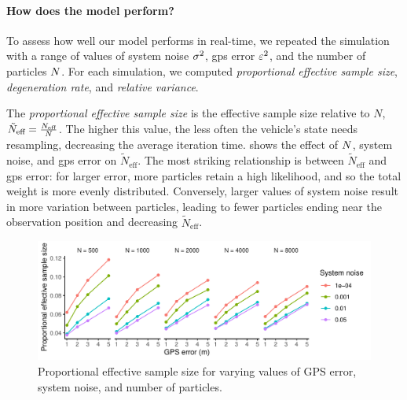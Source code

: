 \paragraph{How does the model perform?}





To assess how well our model performs in real-time, we repeated the simulation with a range of values of system noise $\sigma^2$, \gls{gps} error $\varepsilon^2$, and the number of particles $N$. For each simulation, we computed \emph{proportional effective sample size}, \emph{degeneration rate}, and \emph{relative variance}.

The \emph{proportional effective sample size} is the effective sample size relative to $N$, $\tilde N_\text{eff} = \frac{N_\text{eff}}{N}$. The higher this value, the less often the vehicle's state needs resampling, decreasing the average iteration time.  shows the effect of $N$, system noise, and \gls{gps} error on $\tilde N_\text{eff}$. The most striking relationship is between $\tilde N_\text{eff}$ and \gls{gps} error: for larger error, more particles retain a high likelihood, and so the total weight is more evenly distributed. Conversely, larger values of system noise result in more variation between particles, leading to fewer particles ending near the observation position and decreasing $\tilde N_\text{eff}$.

\begin{knitrout}\small
{}\color{fgcolor}\begin{figure}

{\centering \includegraphics[width=\textwidth]{figure/model_performance_neff-1} 

}

\caption[Proportional effective sample size for varying values of GPS error, system noise, and number of particles]{Proportional effective sample size for varying values of GPS error, system noise, and number of particles.}\label{fig:model_performance_neff}
\end{figure}


\end{knitrout}


